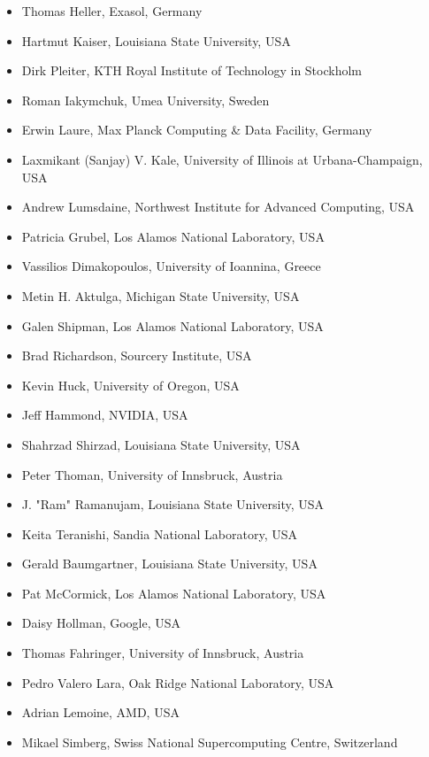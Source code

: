 \documentclass{article}
\begin{document}
\begin{itemize}
    \item Thomas Heller, Exasol, Germany
    \item Hartmut Kaiser, Louisiana State University, USA 
    \item Dirk Pleiter, KTH Royal Institute of Technology in Stockholm
    \item Roman Iakymchuk, Umea University, Sweden
    \item Erwin Laure, Max Planck Computing \& Data Facility, Germany
    \item Laxmikant (Sanjay) V. Kale, University of Illinois at Urbana-Champaign, USA
    \item Andrew Lumsdaine, Northwest Institute for Advanced Computing, USA
    \item Patricia Grubel, Los Alamos National Laboratory, USA
    \item Vassilios Dimakopoulos, University of Ioannina, Greece
    \item Metin H. Aktulga, Michigan State University, USA
    \item Galen Shipman, Los Alamos National Laboratory, USA
    \item Brad Richardson, Sourcery Institute, USA
    \item Kevin Huck, University of Oregon, USA
    \item Jeff Hammond, NVIDIA, USA
    \item Shahrzad Shirzad, Louisiana State University, USA
    \item Peter Thoman, University of Innsbruck, Austria
    \item J. "Ram" Ramanujam, Louisiana State University, USA
    \item Keita Teranishi, Sandia National Laboratory, USA 
    \item Gerald Baumgartner, Louisiana State University, USA 
    \item Pat McCormick, Los Alamos National Laboratory, USA
    \item Daisy Hollman, Google, USA
    \item Thomas Fahringer, University of Innsbruck, Austria
    \item Pedro Valero Lara, Oak Ridge National Laboratory, USA 
    \item Adrian Lemoine, AMD, USA
    \item Mikael Simberg, Swiss National Supercomputing Centre, Switzerland
\end{itemize}
\end{document}
